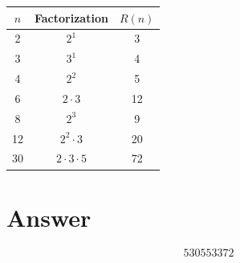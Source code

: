 \documentclass[12pt]{article}
\begin{document}
\begin{center}
\begin{tabular}{ccc}
\toprule
$n$ & Factorization & $R(n)$ \\
\midrule
2  & $2^1$            & 3 \\
3  & $3^1$            & 4 \\
4  & $2^2$            & 5 \\
6  & $2 \cdot 3$      & 12 \\
8  & $2^3$            & 9 \\
12 & $2^2 \cdot 3$    & 20 \\
30 & $2 \cdot 3 \cdot 5$ & 72 \\
\bottomrule
\end{tabular}
\end{center}

\section{Answer}

\[
\boxed{530553372}
\]
\end{document}
